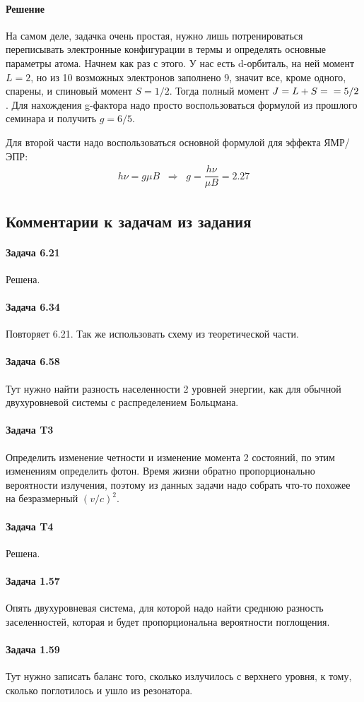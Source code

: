 \documentclass[12pt]{article}
\begin{document}
\paragraph{Решение}
На самом деле, задачка очень простая, нужно лишь потренироваться переписывать электронные конфигурации в термы и определять основные параметры атома. Начнем как раз  с этого. У нас есть d-орбиталь, на ней момент $L=2$, но из 10 возможных электронов заполнено 9, значит все, кроме одного, спарены, и спиновый момент $S=1/2$. Тогда полный момент $J=L+S =\\= 5/2$. Для нахождения g-фактора надо просто воспользоваться формулой из прошлого семинара и получить $g=6/5$.

Для второй части надо воспользоваться основной формулой для эффекта ЯМР/ЭПР:
\begin{gather*}
    h\nu = g\mu B \;\;\Rightarrow\;\; g = \dfrac{h\nu}{\mu B} = 2.27
\end{gather*}


\subsection{Комментарии к задачам из задания}
\paragraph{Задача 6.21} Решена.
\paragraph{Задача 6.34} Повторяет 6.21. Так же использовать схему из теоретической части.
\paragraph{Задача 6.58} Тут нужно найти разность населенности 2 уровней энергии, как для обычной двухуровневой системы с распределением Больцмана.
\paragraph{Задача T3} Определить изменение четности и изменение момента 2 состояний, по этим изменениям определить фотон. Время жизни обратно пропорционально вероятности излучения, поэтому из данных задачи надо собрать что-то похожее на безразмерный $(v/c)^2$.
\paragraph{Задача T4} Решена.
\paragraph{Задача 1.57} Опять двухуровневая система, для которой надо найти среднюю разность заселенностей, которая и будет пропорциональна вероятности поглощения.
\paragraph{Задача 1.59} Тут нужно записать баланс того, сколько излучилось с верхнего уровня, к тому, сколько поглотилось и ушло из резонатора.
\end{document}
